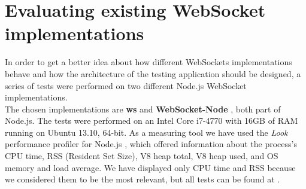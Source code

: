\documentclass[conference]{IEEEtran}
\begin{document}
\section{Evaluating existing WebSocket implementations}
In order to get a better idea about how different WebSockets implementations
behave and how the architecture of the testing application should be designed, a
series of tests were performed on two different Node.js \cite{nodejs} WebSocket
implementations.
\\

The chosen implementations are \textbf{ws} \cite{nodejs-ws}
and \textbf{WebSocket-Node} \cite{nodejs-websocket}, both part of Node.js. The
tests were performed on an Intel Core i7-4770 with 16GB of RAM running on Ubuntu
13.10, 64-bit. As a measuring tool we have used the \textit{Look} performance
profiler for Node.js \cite{nodejs-look}, which offered information about the
process's CPU time, RSS (Resident Set Size), V8 heap total, V8 heap used, and
OS memory and load average. We have displayed only CPU time and RSS because we
considered them to be the most relevant, but all tests can be found at \cite{tests}.
\end{document}
